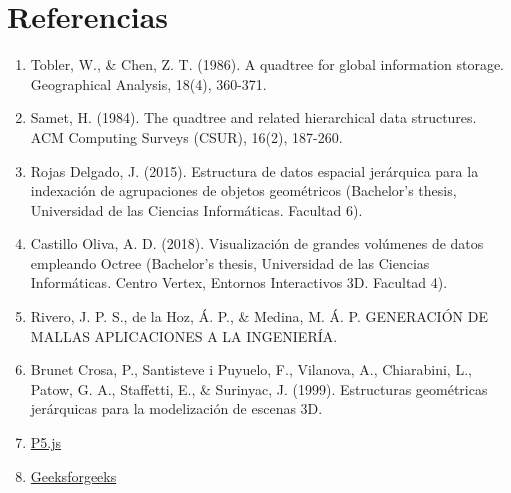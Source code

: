 \documentclass{article}
\begin{document}
    \section{Referencias}
  \begin{enumerate}
    \item Tobler, W., & Chen, Z. T. (1986). A quadtree for global information storage. Geographical Analysis, 18(4), 360-371.
    
    \item Samet, H. (1984). The quadtree and related hierarchical data structures. ACM Computing Surveys (CSUR), 16(2), 187-260.
    
    \item Rojas Delgado, J. (2015). Estructura de datos espacial jerárquica para la indexación de agrupaciones de objetos geométricos (Bachelor's thesis, Universidad de las Ciencias Informáticas. Facultad 6).
    
    \item Castillo Oliva, A. D. (2018). Visualización de grandes volúmenes de datos empleando Octree (Bachelor's thesis, Universidad de las Ciencias Informáticas. Centro Vertex, Entornos Interactivos 3D. Facultad 4).
    
    \item Rivero, J. P. S., de la Hoz, Á. P., & Medina, M. Á. P. GENERACIÓN DE MALLAS APLICACIONES A LA INGENIERÍA.
    
    \item Brunet Crosa, P., Santisteve i Puyuelo, F., Vilanova, A., Chiarabini, L., Patow, G. A., Staffetti, E., & Surinyac, J. (1999). Estructuras geométricas jerárquicas para la modelización de escenas 3D.

    \item \href{https://p5js.org/es/libraries/}{P5.js}
    \item \href{https://www.geeksforgeeks.org/}{Geeksforgeeks}

  \end{enumerate}
\end{document}
